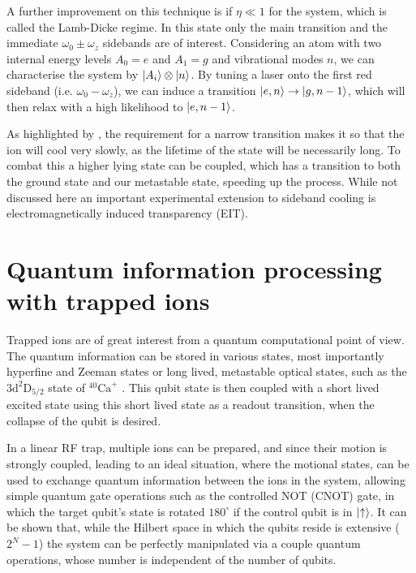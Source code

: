 \documentclass[12pt,twoside]{article}
\begin{document}
A further improvement on this technique is if $\eta \ll 1$ for the system, which is called the Lamb-Dicke regime\cite{Charged_Particle_traps_Cooling}. In this state only the main transition and the immediate $\omega_0 \pm \omega_z$ sidebands are of interest. Considering an atom with two internal energy levels $A_0 = e$ and $A_1 = g$ and vibrational modes $n$, we can characterise the system by $\ket{A_i} \otimes \ket{n}$. By tuning a laser onto the first red sideband (i.e. $\omega_0 - \omega_z$), we can induce a transition $\ket{e,n} \rightarrow \ket{g,n-1}$, which will then relax with a high likelihood to $\ket{e,n-1}$\cite{Ion_cooling}.

As highlighted by \cite{Ion_cooling}, the requirement for a narrow transition makes it so that the ion will cool very slowly, as the lifetime of the state will be necessarily long. To combat this a higher lying state can be coupled, which has a transition to both the ground state and our metastable state, speeding up the process\cite{Charged_Particle_traps_Cooling,Ion_cooling}. While not discussed here an important experimental extension to sideband cooling is electromagnetically induced transparency (EIT)\cite{EIT_cooling,Ion_cooling,Charged_Particle_traps_Cooling}.

\section[QI Processing]{Quantum information processing with trapped ions}
\label{QI}

Trapped ions are of great interest from a quantum computational point of view\cite{QIP_Trapped_ions,QI_Application,Trapped_ion_qbit_toolbox,Cold_trapped_ions_QC}. The quantum information can be stored in various states, most importantly hyperfine and Zeeman states\cite{Trapped_ion_qbit_toolbox} or long lived, metastable optical states, such as the $3\text{d}^2\text{D}_{5/2}$ state of $^{40}\text{Ca}^+$ \cite{QIP_Trapped_ions,Trapped_Quantum_Computer}. This qubit state is then coupled with a short lived excited state using this short lived state as a readout transition, when the collapse of the qubit is desired\cite{Trapped_ion_qbit_toolbox}.

In a linear RF trap, multiple ions can be prepared, and since their motion is strongly coupled\cite{Trapped_ion_qbit_toolbox,QIP_Trapped_ions,QI_Application}, leading to an ideal situation, where the motional states, can be used to exchange quantum information between the ions in the system, allowing simple quantum gate operations such as the controlled NOT (CNOT) gate, in which the target qubit's state is rotated $180^\circ$ if the control qubit is in $\ket{\uparrow}$\cite{Trapped_ion_qbit_toolbox}. It can be shown that, while the Hilbert space in which the qubits reside is extensive ($2^N-1$) the system can be perfectly manipulated via a couple quantum operations, whose number is independent of the number of qubits\cite{Elementary_QGates}. 
\end{document}
